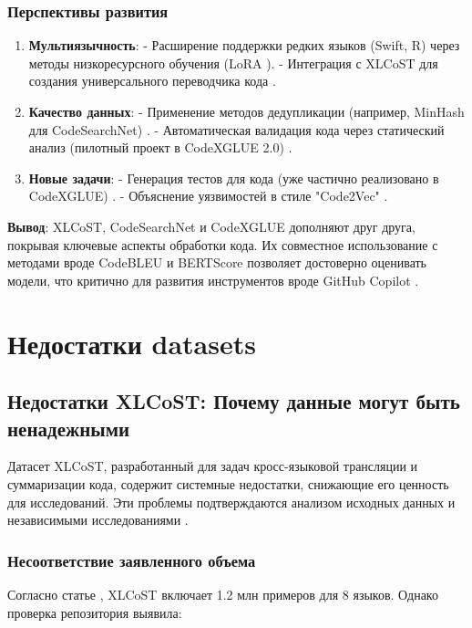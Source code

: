 \documentclass[14pt]{article}
\theoremstyle{definition}
\begin{document}
\subsubsection{Перспективы развития}
\begin{enumerate}
\item \textbf{Мультиязычность}: 
- Расширение поддержки редких языков (Swift, R) через методы низкоресурсного обучения (LoRA \cite{hu2022lora}).
- Интеграция с XLCoST для создания универсального переводчика кода \cite{zhu2022}.

\item \textbf{Качество данных}: 
- Применение методов дедупликации (например, MinHash для CodeSearchNet) \cite{allamanis2019adverse}.
- Автоматическая валидация кода через статический анализ (пилотный проект в CodeXGLUE 2.0) \cite{lu2021codexglue}.

\item \textbf{Новые задачи}: 
- Генерация тестов для кода (уже частично реализовано в CodeXGLUE) \cite{zhou2022devign}.
- Объяснение уязвимостей в стиле "Code2Vec" \cite{alon2019code2seq}.
\end{enumerate}

\textbf{Вывод}: XLCoST, CodeSearchNet и CodeXGLUE дополняют друг друга, покрывая ключевые аспекты обработки кода. Их совместное использование с методами вроде CodeBLEU \cite{ren2021} и BERTScore \cite{zhang2020} позволяет достоверно оценивать модели, что критично для развития инструментов вроде GitHub Copilot \cite{copilot}.


\newpage


\newpage
\section{Недостатки datasets}
\subsection{Недостатки XLCoST: Почему данные могут быть ненадежными}

Датасет XLCoST, разработанный для задач кросс-языковой трансляции и суммаризации кода, содержит системные недостатки, снижающие его ценность для исследований. Эти проблемы подтверждаются анализом исходных данных \cite{zhu2022} и независимыми исследованиями \cite{chen2023}.

\subsubsection{Несоответствие заявленного объема}
Согласно статье \cite{zhu2022}, XLCoST включает 1.2 млн примеров для 8 языков. Однако проверка репозитория \cite{xlcost_repo} выявила:
\end{document}

